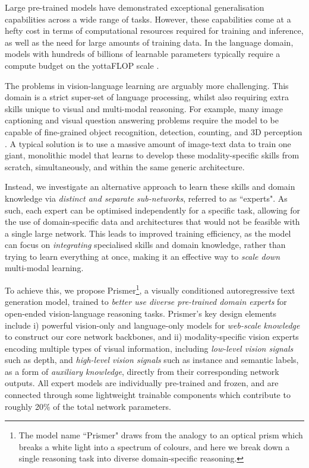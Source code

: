 \documentclass[11pt]{article}
\begin{document}
Large pre-trained models have demonstrated exceptional generalisation capabilities across a wide range of tasks. However, these capabilities come at a hefty cost in terms of computational resources required for training and inference, as well as the need for large amounts of training data. In the language domain, models with hundreds of billions of learnable parameters typically require a compute budget on the yottaFLOP scale \cite{chowdhery2022palm,brown2020gpt3,black2022gptneox,rae2021gopher}. 

The problems in vision-language learning are arguably more challenging. This domain is a strict super-set of language processing, whilst also requiring extra skills unique to visual and multi-modal reasoning.   
For example, many image captioning and visual question answering problems require the model to be capable of fine-grained object recognition, detection, counting, and 3D perception \cite{antol2015vqa,chen2015coco_caption}. A typical solution is to use a massive amount of image-text data to train one giant, monolithic model that learns to develop these modality-specific skills from scratch, simultaneously, and within the same generic architecture.

Instead, we investigate an alternative approach to learn these skills and domain knowledge via {\it distinct and separate sub-networks}, referred to as ``experts". As such, each expert can be optimised independently for a specific task, allowing for the use of domain-specific data and architectures that would not be feasible with a single large network. This leads to improved training efficiency, as the model can focus on {\it integrating} specialised skills and domain knowledge, rather than trying to learn everything at once, making it an effective way to {\it scale down} multi-modal learning.

To achieve this, we propose Prismer\footnote{The model name ``Prismer" draws from the analogy to an optical prism which breaks a white light into a spectrum of colours, and here we break down a single reasoning task into diverse domain-specific reasoning.}, a visually conditioned autoregressive text generation model, trained to {\it better use diverse pre-trained domain experts} for open-ended vision-language reasoning tasks. Prismer's key design elements include i) powerful vision-only and language-only models for {\it web-scale knowledge} to construct our core network backbones, and ii) modality-specific vision experts encoding multiple types of visual information, including {\it low-level vision signals} such as depth, and {\it high-level vision signals} such as instance and semantic labels, as a form of {\it auxiliary knowledge}, directly from their corresponding network outputs. All expert models are individually pre-trained and frozen, and are connected through some lightweight trainable components which contribute to roughly 20\% of the total network parameters. 
\end{document}
